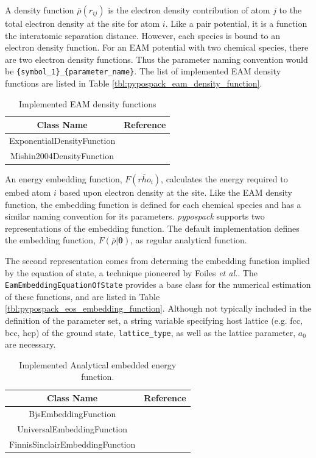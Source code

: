   A density function $\bar{\rho}(r_{ij})$ is the electron density contribution of atom $j$ to the total electron density at the site for atom $i$.  Like a pair potential, it is a function the interatomic separation distance.  However, each species is bound to an electron density function.  For an EAM potential with two chemical species, there are two electron density functions.  Thus the parameter naming convention would be \verb|{symbol_1}_{parameter_name}|.
	The list of implemented EAM density functions are listed in Table \ref{tbl:pypospack_eam_density_function}.

\begin{table}[ht]
	\centering
	\caption{Implemented EAM density functions}
	\begin{tabular}{cc}
		\hline
		{Class Name} & {Reference} \\
		\hline
		ExponentialDensityFunction & \\
		Mishin2004DensityFunction & \cite{mishin2004_eam_NiAl} \\
		\hline
	\end{tabular}
\end{table}

An energy embedding function, $F(\bar{rho}_i)$, calculates the energy required to embed atom $i$ based upon electron density at the site.  Like the EAM density function, the embedding function is defined for each chemical species and has a similar naming convention for its parameters.
\emph{pypospack} supports two representations of the embedding function.
The default implementation defines the embedding function, $F(\bar{\rho}|\bm{\theta})$, as regular analytical function.

The second representation comes from determing the embedding function implied by the equation of state, a technique pioneered by Foiles \emph{et al.}\cite{foiles1986_eam_embedded_eos}.
The \verb|EamEmbeddingEquationOfState| provides a base class for the numerical estimation of these functions, and are listed in Table \ref{tbl:pypospack_eos_embedding_function}.
Although not typically included in the definition of the parameter set, a string variable specifying host lattice (e.g. fcc, bcc, hcp) of the ground state, \verb|lattice_type|, as well as the lattice parameter, $a_0$ are necessary.

\begin{table}[ht]
	\centering
	\caption{Implemented Analytical embedded energy function.}
	\label{tbl:pypospack_embedding_function}
	\begin{tabular}{cc}
		\hline
		{Class Name} & Reference \\
		\hline
		BjsEmbeddingFunction & \\
		UniversalEmbeddingFunction & \\
		FinnisSinclairEmbeddingFunction & \\
		\hline
	\end{tabular}
\end{table}

